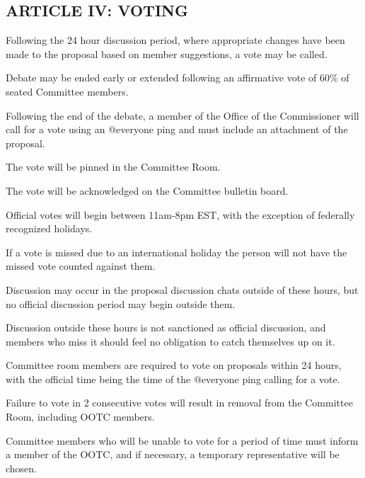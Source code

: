 \subsection{ARTICLE IV: VOTING}
\begin{deepEnumerate}
    \item Following the 24 hour discussion period, where appropriate changes have been made to the proposal based on member suggestions, a vote may be called.
    \item Debate may be ended early or extended following an affirmative vote of 60\% of seated Committee members.
    \item Following the end of the debate, a member of the Office of the Commissioner will call for a vote using an @everyone ping and must include an attachment of the proposal.
    \begin{deepEnumerate}
        \item The vote will be pinned in the Committee Room.
        \item The vote will be acknowledged on the Committee bulletin board.
    \end{deepEnumerate}
    \item Official votes will begin between 11am-8pm EST, with the exception of federally recognized holidays.
    \begin{deepEnumerate}
        \item If a vote is missed due to an international holiday the person will not have the missed vote counted against them.
        \item Discussion may occur in the proposal discussion chats outside of these hours, but no official discussion period may begin outside them.
        \item Discussion outside these hours is not sanctioned as official discussion, and members who miss it should feel no obligation to catch themselves up on it.
    \end{deepEnumerate}
    \item Committee room members are required to vote on proposals within 24 hours, with the official time being the time of the @everyone ping calling for a vote.
    \begin{deepEnumerate}
        \item Failure to vote in 2 consecutive votes will result in removal from the Committee Room, including OOTC members.
        \begin{deepEnumerate}
            \item Committee members who will be unable to vote for a period of time must inform a member of the OOTC, and if necessary, a temporary representative will be chosen.

\end{deepEnumerate}
\end{deepEnumerate}
\end{deepEnumerate}
